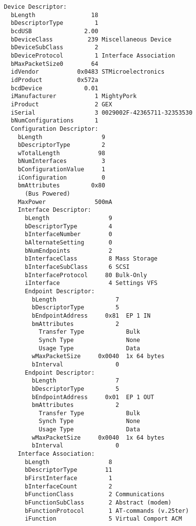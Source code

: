 \hspace*{-1.5em}
\begin{minipage}[t]{0.5\textwidth}\scriptsize
\begin{verbatim}
Device Descriptor:
  bLength                18
  bDescriptorType         1
  bcdUSB               2.00
  bDeviceClass          239 Miscellaneous Device
  bDeviceSubClass         2 
  bDeviceProtocol         1 Interface Association
  bMaxPacketSize0        64
  idVendor           0x0483 STMicroelectronics
  idProduct          0x572a 
  bcdDevice            0.01
  iManufacturer           1 MightyPork
  iProduct                2 GEX
  iSerial                 3 0029002F-42365711-32353530
  bNumConfigurations      1
  Configuration Descriptor:
    bLength                 9
    bDescriptorType         2
    wTotalLength           98
    bNumInterfaces          3
    bConfigurationValue     1
    iConfiguration          0 
    bmAttributes         0x80
      (Bus Powered)
    MaxPower              500mA
    Interface Descriptor:
      bLength                 9
      bDescriptorType         4
      bInterfaceNumber        0
      bAlternateSetting       0
      bNumEndpoints           2
      bInterfaceClass         8 Mass Storage
      bInterfaceSubClass      6 SCSI
      bInterfaceProtocol     80 Bulk-Only
      iInterface              4 Settings VFS
      Endpoint Descriptor:
        bLength                 7
        bDescriptorType         5
        bEndpointAddress     0x81  EP 1 IN
        bmAttributes            2
          Transfer Type            Bulk
          Synch Type               None
          Usage Type               Data
        wMaxPacketSize     0x0040  1x 64 bytes
        bInterval               0
      Endpoint Descriptor:
        bLength                 7
        bDescriptorType         5
        bEndpointAddress     0x01  EP 1 OUT
        bmAttributes            2
          Transfer Type            Bulk
          Synch Type               None
          Usage Type               Data
        wMaxPacketSize     0x0040  1x 64 bytes
        bInterval               0
    Interface Association:
      bLength                 8
      bDescriptorType        11
      bFirstInterface         1
      bInterfaceCount         2
      bFunctionClass          2 Communications
      bFunctionSubClass       2 Abstract (modem)
      bFunctionProtocol       1 AT-commands (v.25ter)
      iFunction               5 Virtual Comport ACM
\end{verbatim}
\end{minipage}\hspace{1em}
